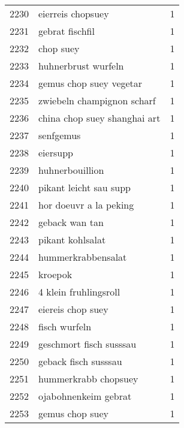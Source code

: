 \begin{tabular}{llr}
2230 &                                  eierreis chopsuey &      1 \\
2231 &                                    gebrat fischfil &      1 \\
2232 &                                          chop suey &      1 \\
2233 &                                huhnerbrust wurfeln &      1 \\
2234 &                            gemus chop suey vegetar &      1 \\
2235 &                         zwiebeln champignon scharf &      1 \\
2236 &                       china chop suey shanghai art &      1 \\
2237 &                                          senfgemus &      1 \\
2238 &                                           eiersupp &      1 \\
2239 &                                    huhnerbouillion &      1 \\
2240 &                             pikant leicht sau supp &      1 \\
2241 &                             hor doeuvr a la peking &      1 \\
2242 &                                     geback wan tan &      1 \\
2243 &                                   pikant kohlsalat &      1 \\
2244 &                                 hummerkrabbensalat &      1 \\
2245 &                                            kroepok &      1 \\
2246 &                              4 klein fruhlingsroll &      1 \\
2247 &                                  eiereis chop suey &      1 \\
2248 &                                      fisch wurfeln &      1 \\
2249 &                            geschmort fisch susssau &      1 \\
2250 &                               geback fisch susssau &      1 \\
2251 &                               hummerkrabb chopsuey &      1 \\
2252 &                               ojabohnenkeim gebrat &      1 \\
2253 &                                    gemus chop suey &      1 \\

\end{tabular}
